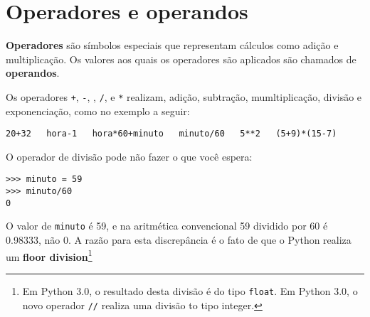 \section{Operadores e operandos}


{\bf Operadores} são símbolos especiais que representam cálculos como 
adição e multiplicação. Os valores aos quais os operadores são aplicados 
são chamados de {\bf operandos}.

Os operadores {\tt +}, {\tt -}, {\tt *}, {\tt /}, e {\tt **} 
realizam, adição, subtração, mumltiplicação, divisão 
e exponenciação, como no exemplo a seguir:

\beforeverb
\begin{verbatim}
20+32   hora-1   hora*60+minuto   minuto/60   5**2   (5+9)*(15-7)
\end{verbatim}
\afterverb
%

O operador de divisão pode não fazer o que você espera: 

\beforeverb
\begin{verbatim}
>>> minuto = 59
>>> minuto/60
0
\end{verbatim}
\afterverb
%

O valor de {\tt minuto} é 59, e na aritmética convencional 59 
dividido por 60 é 0.98333, não 0. A razão para esta discrepância é 
o fato de que o Python realiza um {\bf floor division}\footnote{Em Python 3.0,
o resultado desta divisão é do tipo {\tt float}.  
Em Python 3.0, o novo operador 
{\tt //} realiza uma divisão to tipo integer.}

